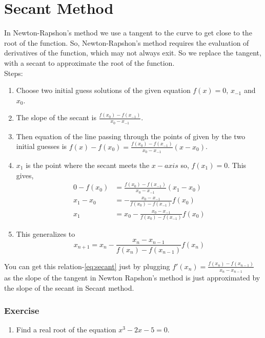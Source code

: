 \documentclass[aima203_lecturenotes_ku.tex]{subfiles}
\begin{document}
\section{Secant Method}
In Newton-Rapshon's method we use a tangent to the curve to get close to the root of the function. So, Newton-Rapshon's method requires the evaluation of derivatives of the function, which may not always exit. So we replace the tangent, with a secant to approximate the root of the function. \\[2mm]
Steps:
\begin{enumerate}
\item Choose two initial guess solutions of the given equation \(f(x)=0\), \(x_{-1}\) and \(x_0\).

\item The slope of the secant is \(\displaystyle \frac{f(x_0)-f(x_{-1})}{x_0 - x_{-1}}\).

\item  Then equation of the line passing through the points of given by the two initial guesses is \(\displaystyle f(x)-f(x_0)= \frac{f(x_0)-f(x_{-1})}{x_0 - x_{-1}} (x - x_0) \).

\item $x_1$ is the point where the secant meets the $x-axis$ so, $f(x_1)=0$. This gives,
  \begin{align*}
    0-f(x_0) &= \frac{f(x_0)-f(x_{-1})}{x_0 - x_{-1}} (x_1 - x_0) \\
    x_1 -x_0 &= - \frac{x_0 - x_{-1}}{f(x_0)-f(x_{-1})} f(x_0) \\
    x_1 &= x_0 - \frac{x_0 - x_{-1}}{f(x_0)-f(x_{-1})} f(x_0)
  \end{align*}

\item This generalizes to
  \begin{equation}
    \label{eq:secant}
    x_{n+1} = x_n - \frac{x_n - x_{n-1}}{f(x_n)-f(x_{n-1})} f(x_n)
  \end{equation}
\end{enumerate}
You can get this relation-\ref{eq:secant} just by plugging $f'(x_n)=\frac{f(x_n)-f(x_{n-1})}{x_n - x_{n-1}}$ as the slope of the tangent in Newton Rapshon's method is just approximated by the slope of the secant in Secant method.

\subsubsection{Exercise}
\begin{enumerate}
\item Find a real root of the equation $x^3-2x-5=0$.
\end{enumerate}
\end{document}
